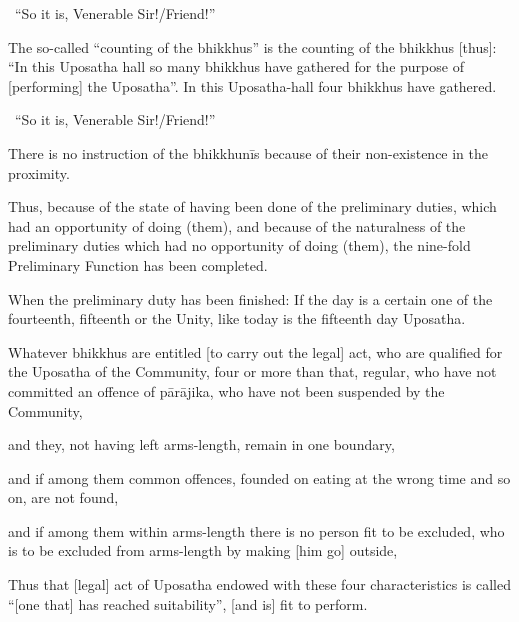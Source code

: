 \begin{center}
	\anglebracketleft\ \hspace{-0.5mm}``So it is, Venerable Sir!/Friend!'' \hspace{-0.5mm}\anglebracketright\
\end{center}

The so-called ``counting of the bhikkhus'' is the counting of the bhikkhus [thus]: ``In this Uposatha hall so many bhikkhus have gathered for the purpose of [performing] the Uposatha''. In this Uposatha-hall four bhikkhus have gathered.

\begin{center}
	\anglebracketleft\ \hspace{-0.5mm}``So it is, Venerable Sir!/Friend!'' \hspace{-0.5mm}\anglebracketright\
\end{center}

There is no instruction of the bhikkhunīs because of their non-existence in the proximity.

Thus, because of the state of having been done of the preliminary duties, which had an opportunity of doing (them), and because of the naturalness of the preliminary duties which had no opportunity of doing (them), the nine-fold Preliminary Function has been completed.

When the preliminary duty has been finished: If the day is a certain one of the fourteenth, fifteenth or the Unity, like today is the fifteenth day Uposatha.

\begin{packedenumerate}
	\item Whatever bhikkhus are entitled [to carry out the legal] act, who are qualified for the Uposatha of the Community, four or more than that, regular, who have not committed an offence of pārājika, who have not been suspended by the Community,
	\item and they, not having left arms-length, remain in one boundary,
	\item and if among them common offences, founded on eating at the wrong time and so on, are not found,
	\item and if among them within arms-length there is no person fit to be excluded, who is to be excluded from arms-length by making [him go] outside,
\end{packedenumerate}

\ifninebythirteenversion\clearpage\fi

Thus that [legal] act of Uposatha endowed with these four characteristics is called ``[one that] has reached suitability'', [and is] fit to perform.

